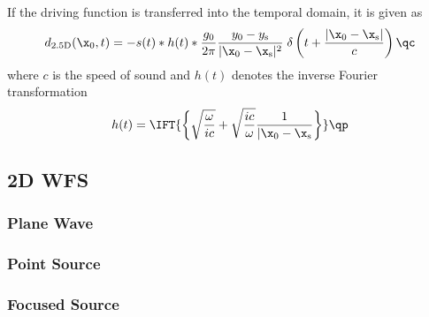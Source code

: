 \documentclass{article}
\begin{document}
If the driving function 
is transferred into the temporal domain,
it is given as
\begin{equation}
    d_{\text{2.5D}}(\x_0,t) = -s(t) * h(t) *
    \frac{g_0}{2\pi}
    \frac{y_0 - y_\text{s}}{|\x_0-\x_\text{s}|^{2}}
    \;\delta\left(t + \frac{|\x_0-\x_\text{s}|}{c}\right)
    \qc
\label{eq:d}
\end{equation}
where $c$ is the speed of sound and
$h(t)$ denotes the inverse Fourier transformation
\begin{equation} 
    h(t) =
    \IFT{\biggl\{ \sqrt{\frac{\omega}{ic}} + \sqrt{\frac{ic}{\omega}}
    \frac{1}{|\x_0-\x_\text{s}} \biggr\}} 
    \qp
    \label{eq:h}
\end{equation}

\subsection{2D WFS}
\label{sec:wfs2d}

\subsubsection{Plane Wave}
\subsubsection{Point Source}
\subsubsection{Focused Source}

\end{document}
